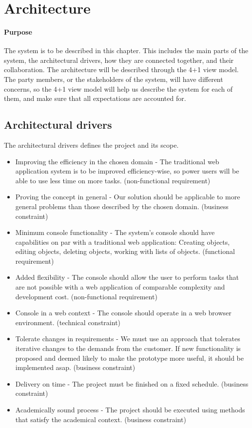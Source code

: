 \chapter{Architecture}

\minitoc

\subsubsection{Purpose}

The system is to be described in this chapter. This includes the main parts of the system, the architectural drivers, how they are connected together, and their collaboration. The architecture will be described through the 4+1 view model. The party members, or the stakeholders of the system, will have different concerns, so the 4+1 view model will help us describe the system for each of them, and make sure that all expectations are accounted for.  

\clearpage


\section{Architectural drivers}
The architectural drivers defines the project and its scope. 

\begin{itemize}
    \item Improving the efficiency in the chosen domain - The traditional web application system is to be improved efficiency-wise, so power users will be able to use less time on more tasks. (non-functional requirement)
    \item Proving the concept in general - Our solution should be applicable to more general problems than those described by the chosen domain. (business constraint)
    \item Minimum console functionality - The system's console should have capabilities on par with a traditional web application: Creating objects, editing objects, deleting objects, working with lists of objects.  (functional requirement)
    \item Added flexibility - The console should allow the user to perform tasks that are not possible with a web application of comparable complexity and development cost. (non-functional requirement)
    \item Console in a web context - The console should operate in a web browser environment. (technical constraint)
    \item Tolerate changes in requirements - We must use an approach that tolerates iterative changes to the demands from the customer. If new functionality is proposed and deemed likely to make the prototype more useful, it should be implemented asap. (business constraint)
    \item Delivery on time - The project must be finished on a fixed schedule. (business constraint) 
    \item Academically sound process - The project should be executed using methods that satisfy the academical context. (business constraint)
\end{itemize}


